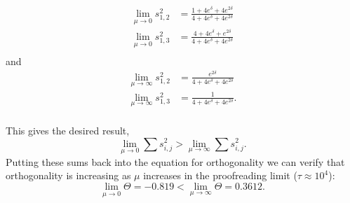 \begin{eqnarray*}
\lim_{\mu\to0}{s^2_{1,2}}&=\frac{1+4e^{\delta}+4e^{2\delta}}{4+4e^{\delta}+4e^{2\delta}}\\
\lim_{\mu\to0}{s^2_{1,3}}&=\frac{4+4e^{\delta}+e^{2\delta}}{4+4e^{\delta}+4e^{2\delta}}\\
\end{eqnarray*}
and
\begin{eqnarray*}
\lim_{\mu\to\infty}{s^2_{1,2}}&=\frac{e^{2\delta}}{4+4e^{\delta}+4e^{2\delta}}\\
\lim_{\mu\to\infty}{s^2_{1,3}}&=\frac{1}{4+4e^{\delta}+4e^{2\delta}}.\\
\end{eqnarray*}

This gives the desired result,
\[
\lim_{\mu\to0}\sum{s^2_{i,j}}>\lim_{\mu\to\infty}\sum{s^2_{i,j}}.
\]
Putting these sums back into the equation for orthogonality we can verify that orthogonality is increasing as $\mu$ increases in the proofreading limit ($\tau\approx10^4$):
\[
\lim_{\mu\to0}\Theta=-0.819<\lim_{\mu\to\infty}\Theta=0.3612.
\]
